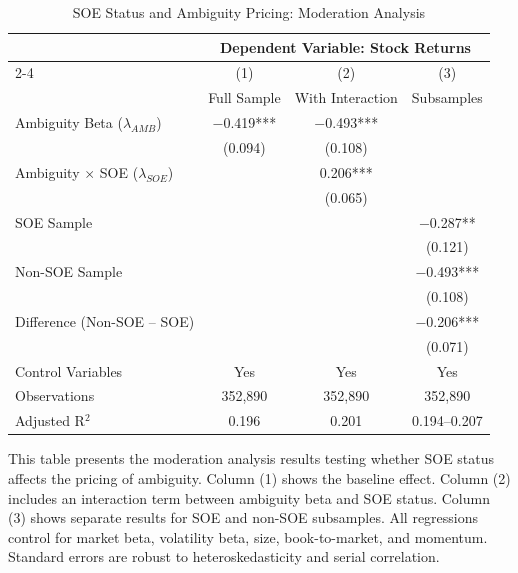 \documentclass[preprint,12pt,authoryear]{elsarticle}
\begin{document}
\begin{table}[htbp]
\centering
\caption{SOE Status and Ambiguity Pricing: Moderation Analysis}
\label{tab:soe_moderation}
\begin{threeparttable}
\begin{tabular*}{\textwidth}{@{\extracolsep{\fill}} lccc @{\extracolsep{\fill}}}
\toprule
& \multicolumn{3}{c}{Dependent Variable: Stock Returns} \\
\cmidrule(lr){2-4}
& (1) & (2) & (3) \\
& Full Sample & With Interaction & Subsamples \\
\midrule
\midrule
Ambiguity Beta ($\lambda_{AMB}$) & $-$0.419*** & $-$0.493*** &  \\
& (0.094) & (0.108) &  \\
\midrule
Ambiguity $\times$ SOE ($\lambda_{SOE}$) & & 0.206*** &  \\
& & (0.065) &  \\
\midrule
SOE Sample & & & $-$0.287** \\
& & & (0.121) \\
\midrule
Non-SOE Sample & & & $-$0.493*** \\
& & & (0.108) \\
\midrule
Difference (Non-SOE -- SOE) & & & $-$0.206*** \\
& & & (0.071) \\
\midrule
Control Variables & Yes & Yes & Yes \\
\midrule
Observations & 352,890 & 352,890 & 352,890 \\
Adjusted R$^2$ & 0.196 & 0.201 & 0.194--0.207 \\
\bottomrule
\end{tabular*}
\begin{tablenotes}[flushleft]
\small
\item[] This table presents the moderation analysis results testing whether SOE status affects the pricing of ambiguity. Column (1) shows the baseline effect. Column (2) includes an interaction term between ambiguity beta and SOE status. Column (3) shows separate results for SOE and non-SOE subsamples. All regressions control for market beta, volatility beta, size, book-to-market, and momentum. Standard errors are robust to heteroskedasticity and serial correlation.
\end{tablenotes}
\end{threeparttable}
\end{table}

\appendix
\end{document}
